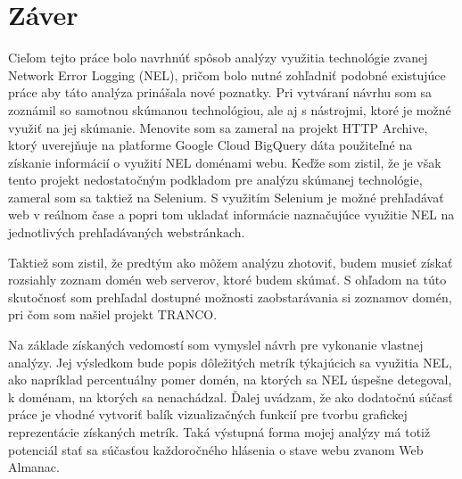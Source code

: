 \chapter{Záver}
\label{zaver}

Cieľom tejto práce bolo navrhnúť spôsob analýzy využitia technológie zvanej Network Error Logging (NEL), pričom bolo nutné zohľadniť podobné existujúce práce aby táto analýza prinášala nové poznatky.
Pri vytváraní návrhu som sa zoznámil so samotnou skúmanou technológiou, ale aj s nástrojmi, ktoré je možné využiť na jej skúmanie.
Menovite som sa zameral na projekt HTTP Archive, ktorý uverejňuje na platforme Google Cloud BigQuery dáta použiteľné na získanie informácií o využití NEL doménami webu.
Keďže som zistil, že je však tento projekt nedostatočným podkladom pre analýzu skúmanej technológie, zameral som sa taktiež na Selenium.
S využitím Selenium je možné prehľadávať web v reálnom čase a popri tom ukladať informácie naznačujúce využitie NEL na jednotlivých prehľadávaných webstránkach.

Taktiež som zistil, že predtým ako môžem analýzu zhotoviť, budem musieť získať rozsiahly zoznam domén web serverov, ktoré budem skúmať. 
S ohľadom na túto skutočnosť som prehľadal dostupné možnosti zaobstarávania si zoznamov domén, pri čom som našiel projekt TRANCO.

Na základe získaných vedomostí som vymyslel návrh pre vykonanie vlastnej analýzy.
Jej výsledkom bude popis dôležitých metrík týkajúcich sa využitia NEL, ako napríklad percentuálny pomer domén, na ktorých sa NEL úspešne detegoval, k doménam, na ktorých sa nenachádzal.
Ďalej uvádzam, že ako dodatočnú súčasť práce je vhodné vytvoriť balík vizualizačných funkcií pre tvorbu grafickej reprezentácie získaných metrík.
Taká výstupná forma mojej analýzy má totiž potenciál stať sa súčasťou každoročného hlásenia o stave webu zvanom Web Almanac. 
